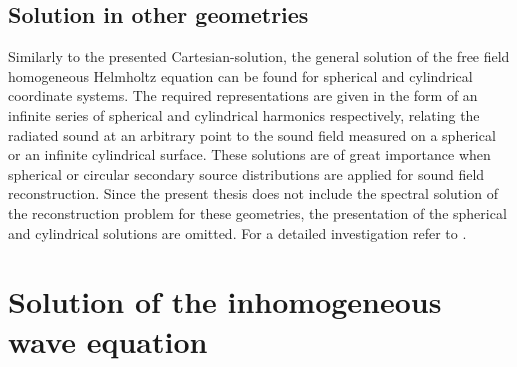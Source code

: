 %
\subsection{Solution in other geometries}
Similarly to the presented Cartesian-solution, the general solution of the free field homogeneous Helmholtz equation can be found for spherical and cylindrical coordinate systems. 
The required representations are given in the form of an infinite series of spherical and cylindrical harmonics respectively, relating the radiated sound at an arbitrary point to the sound field measured on a spherical or an infinite cylindrical surface.
These solutions are of great importance when spherical or circular secondary source distributions are applied for sound field reconstruction. 
Since the present thesis does not include the spectral solution of the reconstruction problem for these geometries, the presentation of the spherical and cylindrical solutions are omitted. 
For a detailed investigation refer to \cite{Williams1999, Zotter2009phd, Ahrens2012}.
%
%
%
%
%
%
%
%
%
%
%
%
\newpage
\section{Solution of the inhomogeneous wave equation}

